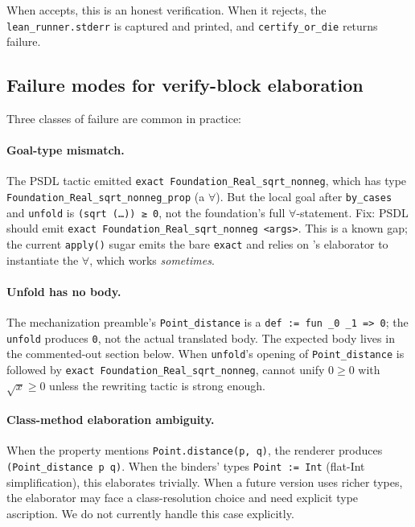 When \Lean{} accepts, this is an honest verification.  When it
rejects, the \texttt{lean\_runner.stderr} is captured and printed,
and \texttt{certify\_or\_die} returns failure.

\subsection{Failure modes for verify-block elaboration}

Three classes of failure are common in practice:

\paragraph{Goal-type mismatch.}  The PSDL tactic emitted
\verb|exact Foundation_Real_sqrt_nonneg|, which has type
\texttt{Foundation\_Real\_sqrt\_nonneg\_prop} (a $\forall$).  But the
local goal after \texttt{by\_cases} and \texttt{unfold} is
\texttt{(sqrt (\dots)) ≥ 0}, not the foundation's full
$\forall$-statement.  Fix: PSDL should emit
\verb|exact Foundation_Real_sqrt_nonneg <args>|.  This is a known
gap; the current \texttt{apply()} sugar emits the bare
\texttt{exact} and relies on \Lean's elaborator to instantiate the
$\forall$, which works \emph{sometimes}.

\paragraph{Unfold has no body.}  The mechanization preamble's
\texttt{Point\_distance} is a \texttt{def := fun \_0 \_1 => 0}; the
\texttt{unfold} produces \texttt{0}, not the actual translated body.
The expected body lives in the commented-out section below.  When
\texttt{unfold}'s opening of \texttt{Point\_distance} is followed by
\texttt{exact Foundation\_Real\_sqrt\_nonneg}, \Lean{} cannot
unify $0 \ge 0$ with $\sqrt{x} \ge 0$ unless the rewriting tactic is
strong enough.

\paragraph{Class-method elaboration ambiguity.}  When the property
mentions \texttt{Point.distance(p, q)}, the renderer produces
\texttt{(Point\_distance p q)}.  When the binders' types
\texttt{Point := Int} (flat-Int simplification), this elaborates
trivially.  When a future version uses richer types, the
elaborator may face a class-resolution choice and need explicit
type ascription.  We do not currently handle this case explicitly.

